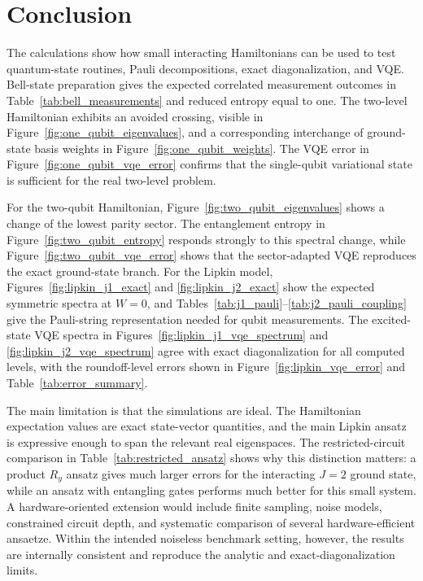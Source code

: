 \documentclass[10pt,a4paper]{article}
\begin{document}
\FloatBarrier
\section{Conclusion}\label{sec:conclusion}

The calculations show how small interacting Hamiltonians can be used to test quantum-state routines, Pauli decompositions, exact diagonalization, and VQE. Bell-state preparation gives the expected correlated measurement outcomes in Table~\ref{tab:bell_measurements} and reduced entropy equal to one. The two-level Hamiltonian exhibits an avoided crossing, visible in Figure~\ref{fig:one_qubit_eigenvalues}, and a corresponding interchange of ground-state basis weights in Figure~\ref{fig:one_qubit_weights}. The VQE error in Figure~\ref{fig:one_qubit_vqe_error} confirms that the single-qubit variational state is sufficient for the real two-level problem.

For the two-qubit Hamiltonian, Figure~\ref{fig:two_qubit_eigenvalues} shows a change of the lowest parity sector. The entanglement entropy in Figure~\ref{fig:two_qubit_entropy} responds strongly to this spectral change, while Figure~\ref{fig:two_qubit_vqe_error} shows that the sector-adapted VQE reproduces the exact ground-state branch. For the Lipkin model, Figures~\ref{fig:lipkin_j1_exact} and \ref{fig:lipkin_j2_exact} show the expected symmetric spectra at $W=0$, and Tables~\ref{tab:j1_pauli}--\ref{tab:j2_pauli_coupling} give the Pauli-string representation needed for qubit measurements. The excited-state VQE spectra in Figures~\ref{fig:lipkin_j1_vqe_spectrum} and \ref{fig:lipkin_j2_vqe_spectrum} agree with exact diagonalization for all computed levels, with the roundoff-level errors shown in Figure~\ref{fig:lipkin_vqe_error} and Table~\ref{tab:error_summary}.

The main limitation is that the simulations are ideal. The Hamiltonian expectation values are exact state-vector quantities, and the main Lipkin ansatz is expressive enough to span the relevant real eigenspaces. The restricted-circuit comparison in Table~\ref{tab:restricted_ansatz} shows why this distinction matters: a product $R_y$ ansatz gives much larger errors for the interacting $J=2$ ground state, while an ansatz with entangling gates performs much better for this small system. A hardware-oriented extension would include finite sampling, noise models, constrained circuit depth, and systematic comparison of several hardware-efficient ansaetze. Within the intended noiseless benchmark setting, however, the results are internally consistent and reproduce the analytic and exact-diagonalization limits.
\end{document}
